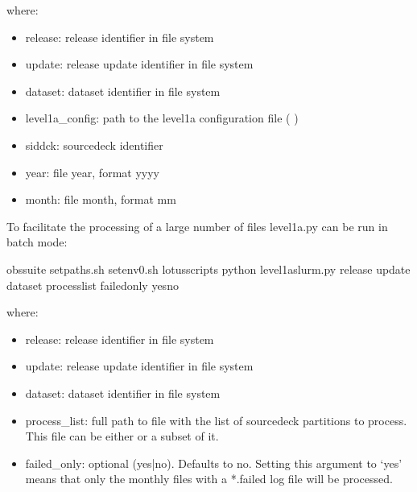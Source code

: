 \documentclass[letterpaper,10pt,english]{sphinxmanual}
\begin{document}
where:
\begin{itemize}
\item {} 
release: release identifier in file system

\item {} 
update: release update identifier in file system

\item {} 
dataset: dataset identifier in file system

\item {} 
level1a\_config: path to the level1a configuration file ( {\hyperref[\detokenize{index:level1a-config-file}]{}})

\item {} 
sid\sphinxhyphen{}dck: source\sphinxhyphen{}deck identifier

\item {} 
year: file year, format yyyy

\item {} 
month: file month, format mm

\end{itemize}

To facilitate the processing of a large number of files level1a.py can be run
in batch mode:

\begin{sphinxVerbatim}[commandchars=\\\{\}]
 obs\PYGZhy{}suite
 setpaths.sh
 setenv0.sh
 lotus\PYGZus{}scripts
python level1a\PYGZus{}slurm.py release update dataset  process\PYGZus{}list \PYGZhy{}\PYGZhy{}failed\PYGZus{}only yesno
\end{sphinxVerbatim}

where:
\begin{itemize}
\item {} 
release: release identifier in file system

\item {} 
update: release update identifier in file system

\item {} 
dataset: dataset identifier in file system

\item {} 
process\_list: full path to file with the list of source\sphinxhyphen{}deck partitions to
process. This file can be either {\hyperref[\detokenize{index:process-list-file}]{}} or a subset of it.

\item {} 
failed\_only: optional (yes|no). Defaults to no. Setting this argument to ‘yes’
means that only the monthly files with a *.failed log file will be processed.

\end{itemize}
\end{document}
